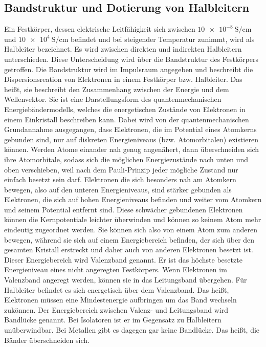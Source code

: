 \subsection{Bandstruktur und Dotierung von Halbleitern}
Ein Festkörper, dessen elektrische Leitfähigkeit sich zwischen $\SI{10e-8}{\siemens\per\centi\meter}$
und $\SI{10e4}{\siemens\per\centi\meter}$ befindet und bei steigender Temperatur 
zunimmt, wird als Halbleiter bezeichnet. 
Es wird zwischen direkten und indirekten Halbleitern unterschieden.
Diese Unterscheidung wird über die Bandstruktur des Festkörpers getroffen.
Die Bandstruktur wird im Impulsraum angegeben und beschreibt die 
Dispersionsreation von Elektronen in einem Festkörper bzw. Halbleiter. 
Das heißt, sie beschreibt den Zusammenhang zwischen der Energie und dem Wellenvektor.
Sie ist eine Darstellungsform des quantenmechanischen Energiebändermodells, welches 
die energetischen Zustände von Elektronen in einem Einkristall beschreiben kann.
Dabei wird von der quantenmechanischen Grundannahme ausgegangen, dass Elektronen, die 
im Potential eines Atomkerns gebunden sind, nur auf diskreten Energieniveaus 
(bzw. Atomorbitalen) existieren können. Werden Atome einander nah genug angenähert,
dann überschneiden sich ihre Atomorbitale, sodass sich die möglichen Energiezustände 
nach unten und oben verschieben, weil nach dem Pauli-Prinzip jeder mögliche Zustand nur 
einfach besetzt sein darf. Elektronen die sich besonders nah
am Atomkern bewegen, also auf den unteren 
Energieniveaus, sind stärker gebunden als Elektronen, die sich auf hohen 
Energieniveaus befinden und weiter vom Atomkern und seinem Potential entfernt sind. 
Diese schwächer gebundenen Elektronen können die Kernpotentiale leichter überwinden 
und können so keinem Atom mehr eindeutig zugeordnet werden. Sie können sich also von einem 
Atom zum anderen bewegen, während sie sich auf einem Energiebereich befinden, der sich über 
den gesamten Kristall erstreckt und daher auch von anderen Elektronen besetzt ist.
Dieser Energiebereich wird Valenzband genannt. Er ist das höchste besetzte Energieniveau 
eines nicht angeregten Festkörpers. Wenn Elektronen im Valenzband angeregt werden, können 
sie in das Leitungsband übergehen. Für Halbleiter befindet es sich energetisch über 
dem Valenzband. Das heißt, Elektronen müssen eine Mindestenergie aufbringen um das 
Band wechseln zukönnen. Der Energiebereich zwischen Valenz- und Leitungsband 
wird Bandlücke genannt. Bei Isolatoren ist er im Gegensatz zu Halbleitern unüberwindbar.
Bei Metallen gibt es dagegen gar keine 
Bandlücke. Das heißt, die Bänder überschneiden sich. 
